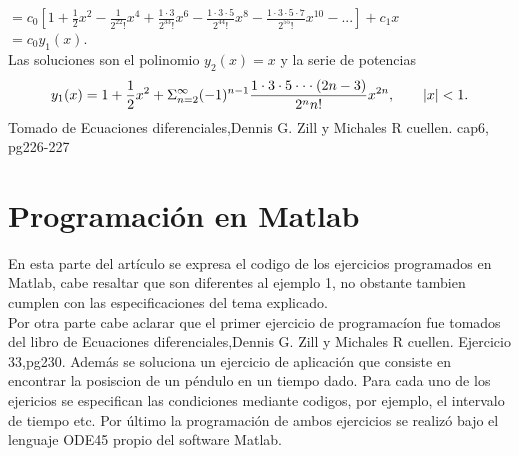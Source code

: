 \documentclass[12pt,letterpaper,oneside]{article}
\begin{document}
 \hspace*{0.3cm} $ =c_0 \left[ 1 + \frac{1}{2} x^2 - \frac{1}{2^22!} x^4 + \frac{1\cdot3}{2^33!}x^6 - \frac{1\cdot3\cdot5}{2^44!}x^8 - \frac{1\cdot3\cdot5\cdot7}{2^55!}x^10 - ... \right] + c_1x$ \vspace{0.3cm}\\
 \hspace*{0.3cm} $= c_0 y_1 (x)$.\vspace{0.3cm}\\
 Las soluciones son el polinomio $y_2 (x) = x$ y la serie de potencias\\
 \begin{align*}
 y_1 (x) = 1 + \frac{1}{2} x^2 + \Sigma{^\infty_{n=2}} (-1)^{n-1} \frac{1\cdot3\cdot5\cdot\cdot\cdot(2n - 3)}{2^nn!} x^{2n}, \hspace{0.7cm} |x| < 1.
 \end{align*}
 Tomado de Ecuaciones diferenciales,Dennis G. Zill y Michales R cuellen. cap6, pg226-227
\section{Programación en Matlab}
En esta parte del artículo se expresa el codigo de los ejercicios programados en Matlab, cabe resaltar que son diferentes al ejemplo 1, no obstante tambien cumplen con las especificaciones del tema explicado.\\
Por otra parte cabe aclarar que el primer ejercicio de programacíon fue tomados del libro de Ecuaciones diferenciales,Dennis G. Zill y Michales R cuellen. Ejercicio 33,pg230. Además se soluciona un ejercicio de aplicación que consiste en encontrar la posiscion de un péndulo en un tiempo dado. Para cada uno de los ejericios se especifican las condiciones mediante codigos, por ejemplo, el intervalo de tiempo etc. Por último la programación de ambos ejercicios se realizó bajo el lenguaje ODE45 propio del software Matlab.\\
\end{document}
